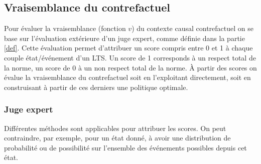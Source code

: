 \documentclass[11pt]{extarticle}
\begin{document}
 \subsection{Vraisemblance du contrefactuel}
 Pour évaluer la vraisemblance (fonction $v$) du contexte causal contrefactuel on se base sur l'évaluation extérieure d'un juge expert, comme définie dans la partie \ref{def}. Cette évaluation permet d'attribuer un score compris entre 0 et 1 à chaque couple état/événement d'un LTS. Un score de 1 corresponds à un respect total de la norme, un score de 0 à un non respect total de la norme. 
 À partir des scores on évalue la vraisemblance du contrefactuel soit en l'exploitant directement, soit en construisant à partir de ces derniers une politique optimale.
 
 \subsubsection{Juge expert}
Différentes méthodes sont applicables pour attribuer les scores. On peut contraindre, par exemple, pour un état donné, à avoir une distribution de probabilité ou de possibilité sur l'ensemble des événements possibles depuis cet état.
\end{document}
